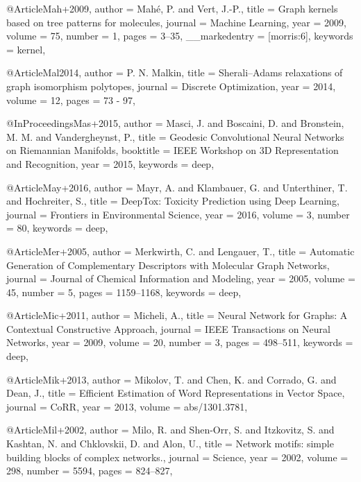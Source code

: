 @Article{Mah+2009,
  author        = {Mah\'{e}, P. and Vert, J.-P.},
  title         = {Graph kernels based on tree patterns for molecules},
  journal       = {Machine Learning},
  year          = {2009},
  volume        = {75},
  number        = {1},
  pages         = {3--35},
  __markedentry = {[morris:6]},
  keywords      = {kernel},
}

@Article{Mal2014,
  author  = {P. N. Malkin},
  title   = {Sherali–Adams relaxations of graph isomorphism polytopes},
  journal = {Discrete Optimization},
  year    = {2014},
  volume  = {12},
  pages   = {73 - 97},
}

@InProceedings{Mas+2015,
  author    = {Masci, J. and Boscaini, D. and Bronstein, M. M. and Vandergheynst, P.},
  title     = {Geodesic Convolutional Neural Networks on Riemannian Manifolds},
  booktitle = {{IEEE} Workshop on 3D Representation and Recognition},
  year      = {2015},
  keywords  = {deep},
}

@Article{May+2016,
  author   = {Mayr, A. and Klambauer, G. and Unterthiner, T. and Hochreiter, S.},
  title    = {{DeepTox: Toxicity Prediction using Deep Learning}},
  journal  = {Frontiers in Environmental Science},
  year     = {2016},
  volume   = {3},
  number   = {80},
  keywords = {deep},
}

@Article{Mer+2005,
  author   = {Merkwirth, C. and Lengauer, T.},
  title    = {Automatic Generation of Complementary Descriptors with Molecular Graph Networks},
  journal  = {Journal of Chemical Information and Modeling},
  year     = {2005},
  volume   = {45},
  number   = {5},
  pages    = {1159--1168},
  keywords = {deep},
}

@Article{Mic+2011,
  author   = {Micheli, A.},
  title    = {Neural Network for Graphs: A Contextual Constructive Approach},
  journal  = {IEEE Transactions on Neural Networks},
  year     = {2009},
  volume   = {20},
  number   = {3},
  pages    = {498--511},
  keywords = {deep},
}

@Article{Mik+2013,
  author  = {Mikolov, T. and Chen, K. and Corrado, G. and Dean, J.},
  title   = {Efficient Estimation of Word Representations in Vector Space},
  journal = {CoRR},
  year    = {2013},
  volume  = {abs/1301.3781},
}

@Article{Mil+2002,
  author  = {Milo, R. and Shen-Orr, S. and Itzkovitz, S. and Kashtan, N. and Chklovskii, D. and Alon, U.},
  title   = {Network motifs: simple building blocks of complex networks.},
  journal = {Science},
  year    = {2002},
  volume  = {298},
  number  = {5594},
  pages   = {824--827},
}


